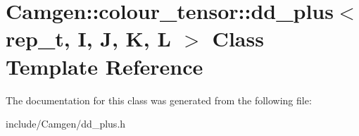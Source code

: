 \hypertarget{a00121}{}\section{Camgen\+:\+:colour\+\_\+tensor\+:\+:dd\+\_\+plus$<$ rep\+\_\+t, I, J, K, L $>$ Class Template Reference}
\label{a00121}


The documentation for this class was generated from the following file\+:\begin{DoxyCompactItemize}
\item 
include/\+Camgen/dd\+\_\+plus.\+h\end{DoxyCompactItemize}
